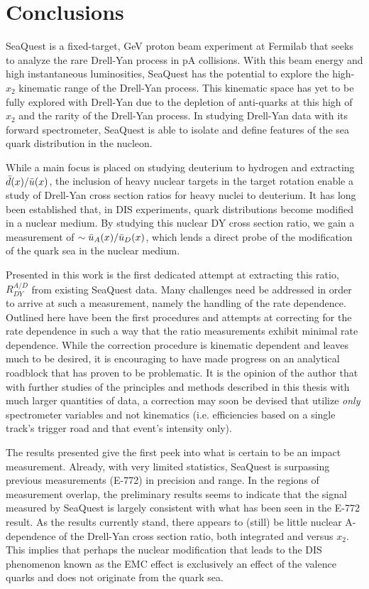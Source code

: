 
\chapter{Conclusions}

SeaQuest is a fixed-target, \unit[120]{GeV} proton beam experiment at Fermilab that seeks to analyze the rare Drell-Yan process in pA collisions. With this beam energy and high instantaneous luminosities, SeaQuest has the potential to explore the high-$x_2$ kinematic range of the Drell-Yan process. This kinematic space has yet to be fully explored with Drell-Yan due to the depletion of anti-quarks at this high of $x_2$ and the rarity of the Drell-Yan process. In studying Drell-Yan data with its forward spectrometer, SeaQuest is able to isolate and define features of the sea quark distribution in the nucleon.

While a main focus is placed on studying deuterium to hydrogen and extracting $\bar{d}(x)/\bar{u}(x)$, the inclusion of heavy nuclear targets in the target rotation enable a study of Drell-Yan cross section ratios for heavy nuclei to deuterium. It has long been established that, in DIS experiments, quark distributions become modified in a nuclear medium. By studying this nuclear DY cross section ratio, we gain a measurement of $\sim\bar{u}_A(x)/\bar{u}_D(x)$, which lends a direct probe of the modification of the quark sea in the nuclear medium.

Presented in this work is the first dedicated attempt at extracting this ratio, $R^{A/D}_{DY}$ from existing SeaQuest data. Many challenges need be addressed in order to arrive at such a measurement, namely the handling of the rate dependence. Outlined here have been the first procedures and attempts at correcting for the rate dependence in such a way that the ratio measurements exhibit minimal rate dependence. While the correction procedure is kinematic dependent and leaves much to be desired, it is encouraging to have made progress on an analytical roadblock that has proven to be problematic. It is the opinion of the author that with further studies of the principles and methods described in this thesis with much larger quantities of data, a correction may soon be devised that utilize \emph{only} spectrometer variables and not kinematics (i.e. efficiencies based on a single track's trigger road and that event's intensity only).

The results presented give the first peek into what is certain to be an impact measurement. Already, with very limited statistics, SeaQuest is surpassing previous measurements (E-772) in precision and range. In the regions of measurement overlap, the preliminary results seems to indicate that the signal measured by SeaQuest is largely consistent with what has been seen in the E-772 result.  As the results currently stand, there appears to (still) be little nuclear A-dependence of the Drell-Yan cross section ratio, both integrated and versus $x_2$. This implies that perhaps the nuclear modification that leads to the DIS phenomenon known as the EMC effect is exclusively an effect of the valence quarks and does not originate from the quark sea.

